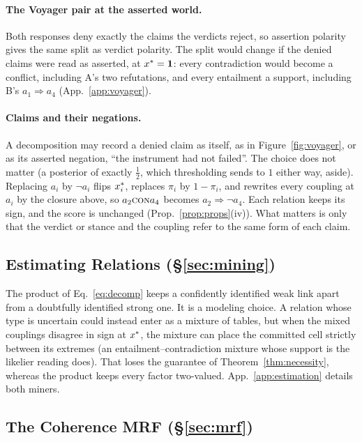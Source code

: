 \paragraph{The Voyager pair at the asserted world.} Both responses deny exactly the claims the
verdicts reject, so assertion polarity gives the same split as verdict polarity. The split would
change if the denied claims were read as asserted, at $x^{\ast}=\mathbf{1}$: every contradiction would become a
conflict, including A's two refutations, and every entailment a support, including B's
$a_1\Rightarrow a_4$ (App.~\ref{app:voyager}).

\paragraph{Claims and their negations.} A decomposition may record a denied claim as itself, as in
Figure~\ref{fig:voyager}, or as its asserted negation, ``the instrument had not failed''. The choice
does not matter (a posterior of exactly $\frac12$, which thresholding sends to $1$ either way,
aside). Replacing $a_i$ by $\neg a_i$ flips $x^{\ast}_i$, replaces $\pi_i$ by $1-\pi_i$, and rewrites
every coupling at $a_i$ by the closure above, so $a_2\textsc{con} a_4$ becomes $a_2\Rightarrow\neg a_4$.
Each relation keeps its sign, and the score is unchanged (Prop.~\ref{prop:props}(iv)). What matters
is only that the verdict or stance and the coupling refer to the same form of each claim.

\subsection{Estimating Relations (\S\ref{sec:mining})}

The product of Eq.~\ref{eq:decomp} keeps a confidently identified weak link apart from a doubtfully
identified strong one. It is a modeling choice. A relation whose type is uncertain could instead
enter as a mixture of tables, but when the mixed couplings disagree in sign at $x^{\ast}$, the mixture
can place the committed cell strictly between its extremes (an entailment--contradiction mixture
whose support is the likelier reading does). That loses the guarantee of
Theorem~\ref{thm:necessity}, whereas the product keeps every factor two-valued.
App.~\ref{app:estimation} details both miners.

\subsection{The Coherence MRF (\S\ref{sec:mrf})}
\label{app:framework-mrf}

